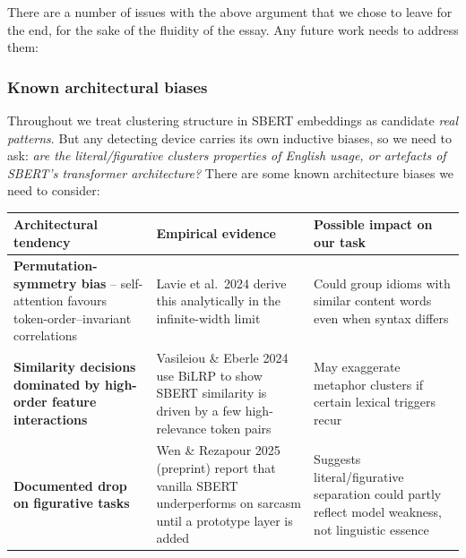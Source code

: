 \documentclass[12pt]{article}
\begin{document}
There are a number of issues with the above argument that we chose to leave for the end, for the sake of the fluidity of the essay. Any future work needs to address them:

\subsubsection{Known architectural biases}\label{known-architectural-biases}

Throughout we treat clustering structure in SBERT embeddings as candidate \emph{real patterns}. But any detecting device carries its own inductive biases, so we need to ask: \emph{are the literal/figurative clusters properties of English usage, or artefacts of SBERT's transformer architecture?} There are some known architecture biases we need to consider:

\begin{longtable}[]{@{}
  >{\raggedright\arraybackslash}p{}
  >{\raggedright\arraybackslash}p{}
  >{\raggedright\arraybackslash}p{}@{}}
\toprule\noalign{}
\begin{minipage}[b]{\linewidth}\raggedright
Architectural tendency
\end{minipage} & \begin{minipage}[b]{\linewidth}\raggedright
Empirical evidence
\end{minipage} & \begin{minipage}[b]{\linewidth}\raggedright
Possible impact on our task
\end{minipage} \\
\midrule\noalign{}
\endhead
\bottomrule\noalign{}
\endlastfoot
\textbf{Permutation-symmetry bias} -- self-attention favours token-order--invariant correlations & Lavie et al.~2024 derive this analytically in the infinite-width limit & Could group idioms with similar content words even when syntax differs \\
\textbf{Similarity decisions dominated by high-order feature interactions} & Vasileiou \& Eberle 2024 use BiLRP to show SBERT similarity is driven by a few high-relevance token pairs & May exaggerate metaphor clusters if certain lexical triggers recur \\
\textbf{Documented drop on figurative tasks} & Wen \& Rezapour 2025 (preprint) report that vanilla SBERT underperforms on sarcasm until a prototype layer is added & Suggests literal/figurative separation could partly reflect model weakness, not linguistic essence \\
\end{longtable}
\end{document}
